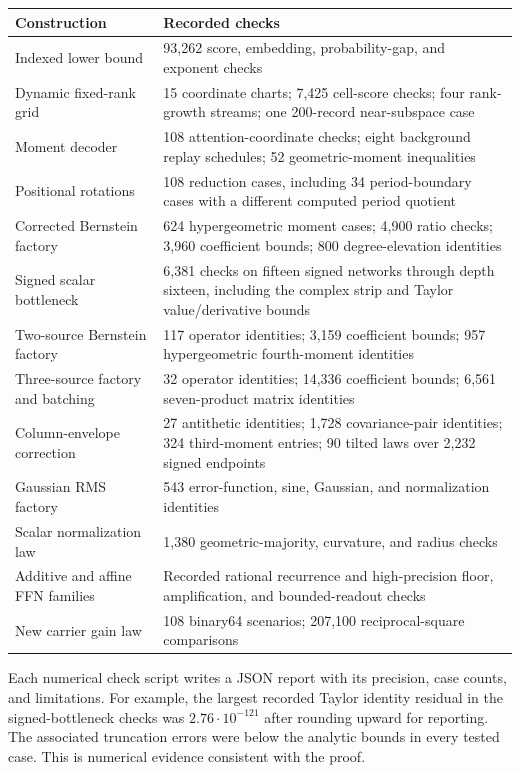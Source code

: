 \begin{table}[!htb]
\centering\small
\begin{tabularx}{\textwidth}{@{}p{}Y@{}}
\toprule
Construction & Recorded checks\\
\midrule
Indexed lower bound &
93,262 score, embedding, probability-gap, and exponent checks\\
Dynamic fixed-rank grid &
15 coordinate charts; 7,425 cell-score checks;
four rank-growth streams; one 200-record near-subspace case\\
Moment decoder &
108 attention-coordinate checks; eight background replay
schedules; 52 geometric-moment inequalities\\
Positional rotations &
108 reduction cases, including 34 period-boundary cases
with a different computed period quotient\\
Corrected Bernstein factory &
624 hypergeometric moment cases; 4,900 ratio checks;
3,960 coefficient bounds; 800 degree-elevation identities\\
Signed scalar bottleneck &
6,381 checks on fifteen signed networks through depth sixteen,
including the complex strip and Taylor value/derivative bounds\\
Two-source Bernstein factory &
117 operator identities; 3,159 coefficient bounds;
957 hypergeometric fourth-moment identities\\
Three-source factory and batching &
32 operator identities; 14,336 coefficient bounds;
6,561 seven-product matrix identities\\
Column-envelope correction &
27 antithetic identities; 1,728 covariance-pair identities;
324 third-moment entries; 90 tilted laws over 2,232 signed endpoints\\
Gaussian RMS factory &
543 error-function, sine, Gaussian, and normalization identities\\
Scalar normalization law &
1,380 geometric-majority, curvature, and radius checks\\
Additive and affine FFN families &
Recorded rational recurrence and high-precision floor,
amplification, and bounded-readout checks\\
New carrier gain law &
108 binary64 scenarios; 207,100 reciprocal-square comparisons\\
\bottomrule
\end{tabularx}
\end{table}

Each numerical check script writes a JSON report with its precision,
case counts, and limitations. For example, the largest recorded
Taylor identity residual in the signed-bottleneck checks was
$2.76\cdot10^{-121}$ after rounding upward for reporting.
The associated truncation errors were below the analytic
bounds in every tested case. This is numerical evidence
consistent with the proof.


